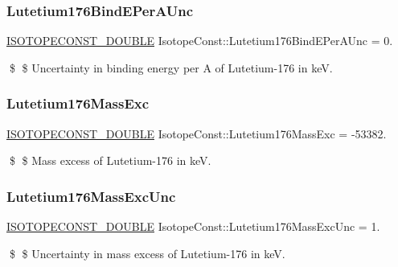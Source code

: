 \subsubsection{\texorpdfstring{Lutetium176\+Bind\+E\+Per\+A\+Unc}{Lutetium176BindEPerAUnc}}
{\footnotesize\ttfamily \mbox{\hyperlink{group___isotope_const-_macros_ga8f45a7272ce02c0b4c65c44636ed719a}{I\+S\+O\+T\+O\+P\+E\+C\+O\+N\+S\+T\+\_\+\+D\+O\+U\+B\+LE}} Isotope\+Const\+::\+Lutetium176\+Bind\+E\+Per\+A\+Unc = 0.}

\$ \$ Uncertainty in binding energy per A of Lutetium-\/176 in keV. \mbox{\label{group___isotope_const-_lutetium-_lu176_ga3ec1d5b665255b57d3e3f1377837db5c}} 
\subsubsection{\texorpdfstring{Lutetium176\+Mass\+Exc}{Lutetium176MassExc}}
{\footnotesize\ttfamily \mbox{\hyperlink{group___isotope_const-_macros_ga8f45a7272ce02c0b4c65c44636ed719a}{I\+S\+O\+T\+O\+P\+E\+C\+O\+N\+S\+T\+\_\+\+D\+O\+U\+B\+LE}} Isotope\+Const\+::\+Lutetium176\+Mass\+Exc = -\/53382.}

\$ \$ Mass excess of Lutetium-\/176 in keV. \mbox{\label{group___isotope_const-_lutetium-_lu176_gab3b149d6d16a2cf6c641473b61617bd2}} 
\subsubsection{\texorpdfstring{Lutetium176\+Mass\+Exc\+Unc}{Lutetium176MassExcUnc}}
{\footnotesize\ttfamily \mbox{\hyperlink{group___isotope_const-_macros_ga8f45a7272ce02c0b4c65c44636ed719a}{I\+S\+O\+T\+O\+P\+E\+C\+O\+N\+S\+T\+\_\+\+D\+O\+U\+B\+LE}} Isotope\+Const\+::\+Lutetium176\+Mass\+Exc\+Unc = 1.}

\$ \$ Uncertainty in mass excess of Lutetium-\/176 in keV. \mbox{\label{group___isotope_const-_lutetium-_lu176_ga486402a5ecc2c23c388d7120143b9d74}} 
